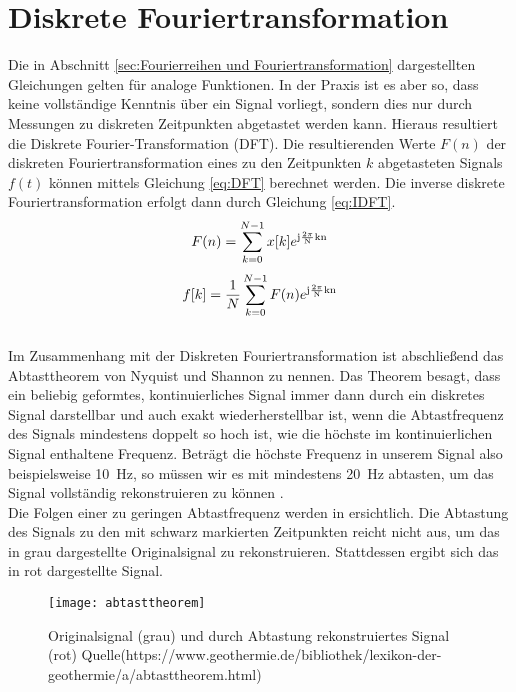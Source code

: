 \section{Diskrete Fouriertransformation}
\label{sec.Diskrete Fouriertransformation}
Die in Abschnitt \ref{sec:Fourierreihen und Fouriertransformation} dargestellten Gleichungen gelten für analoge Funktionen. In der Praxis ist es aber so, dass keine vollständige Kenntnis über ein Signal vorliegt, sondern dies nur durch Messungen zu diskreten Zeitpunkten abgetastet werden kann. Hieraus resultiert die Diskrete Fourier-Transformation (DFT). Die resultierenden Werte $F(n)$ der diskreten Fouriertransformation eines zu den Zeitpunkten $k$ abgetasteten Signals $f(t)$ können mittels Gleichung \ref{eq:DFT} berechnet werden. Die inverse diskrete Fouriertransformation erfolgt dann durch Gleichung \ref{eq:IDFT}.
\begin{equation}
	\label{eq:DFT}
	F(n) = \sum_{k=0}^{N-1}x[k]e^{\mathrm{j\frac{2\pi}{N}kn}}
\end{equation}
\begin{equation}
	\label{eq:IDFT}
	f[k] = \frac{1}{N}\sum_{k=0}^{N-1}F(n)e^{\mathrm{j\frac{2\pi}{N}kn}}
\end{equation} \\
Im Zusammenhang mit der Diskreten Fouriertransformation ist abschließend das Abtasttheorem von Nyquist und Shannon zu nennen. Das Theorem besagt, dass ein beliebig geformtes, kontinuierliches Signal immer dann durch ein diskretes Signal darstellbar und auch exakt wiederherstellbar ist, wenn die Abtastfrequenz des Signals mindestens doppelt so hoch ist, wie die höchste im kontinuierlichen Signal enthaltene Frequenz. Beträgt die höchste Frequenz in unserem Signal also beispielsweise \SI{10}{\Hz}, so müssen wir es mit mindestens \SI{20}{\Hz} abtasten, um das Signal vollständig rekonstruieren zu können  \cite{Wendemuth.2005}. \\
Die Folgen einer zu geringen Abtastfrequenz werden in  ersichtlich. Die Abtastung des Signals zu den mit schwarz markierten Zeitpunkten reicht nicht aus, um das in grau dargestellte Originalsignal zu rekonstruieren. Stattdessen ergibt sich das in rot dargestellte Signal.
\begin{figure}[!ht]
	\begin{center}
		\texttt{[image: abtasttheorem]}
		\caption{Originalsignal (grau) und durch Abtastung rekonstruiertes Signal (rot) Quelle(https://www.geothermie.de/bibliothek/lexikon-der-geothermie/a/abtasttheorem.html)}
		\label{fig.Abtasttheorem}
	\end{center}
\end{figure}
